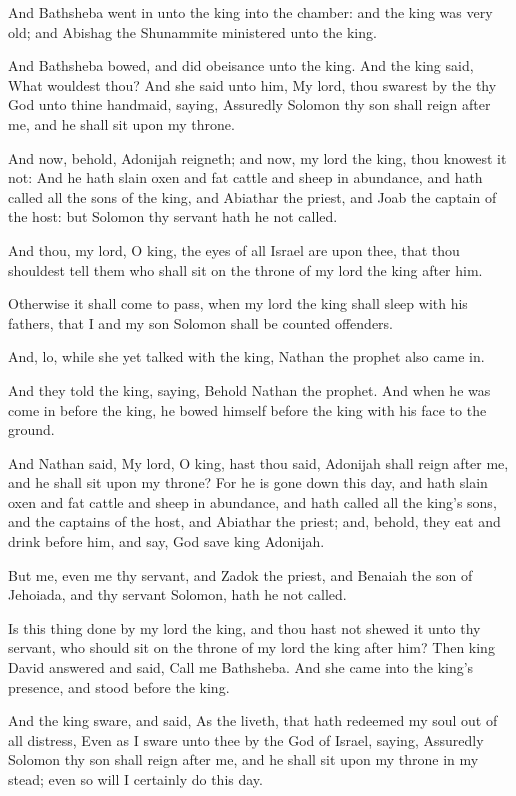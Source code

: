 \Verse And Bathsheba went in unto the king into the chamber: and the king was very old; and Abishag the Shunammite ministered unto the king.

\Verse And Bathsheba bowed, and did obeisance unto the king. And the king said, What wouldest thou?  \Verse And she said unto him, My lord, thou swarest by the \LORD thy God unto thine handmaid, saying, Assuredly Solomon thy son shall reign after me, and he shall sit upon my throne.

\Verse And now, behold, Adonijah reigneth; and now, my lord the king, thou knowest it not: \Verse And he hath slain oxen and fat cattle and sheep in abundance, and hath called all the sons of the king, and Abiathar the priest, and Joab the captain of the host: but Solomon thy servant hath he not called.

\Verse And thou, my lord, O king, the eyes of all Israel are upon thee, that thou shouldest tell them who shall sit on the throne of my lord the king after him.

\Verse Otherwise it shall come to pass, when my lord the king shall sleep with his fathers, that I and my son Solomon shall be counted offenders.

\Verse And, lo, while she yet talked with the king, Nathan the prophet also came in.

\Verse And they told the king, saying, Behold Nathan the prophet. And when he was come in before the king, he bowed himself before the king with his face to the ground.

\Verse And Nathan said, My lord, O king, hast thou said, Adonijah shall reign after me, and he shall sit upon my throne?  \Verse For he is gone down this day, and hath slain oxen and fat cattle and sheep in abundance, and hath called all the king's sons, and the captains of the host, and Abiathar the priest; and, behold, they eat and drink before him, and say, God save king Adonijah.

\Verse But me, even me thy servant, and Zadok the priest, and Benaiah the son of Jehoiada, and thy servant Solomon, hath he not called.

\Verse Is this thing done by my lord the king, and thou hast not shewed it unto thy servant, who should sit on the throne of my lord the king after him?  \Verse Then king David answered and said, Call me Bathsheba.  And she came into the king's presence, and stood before the king.

\Verse And the king sware, and said, As the \LORD liveth, that hath redeemed my soul out of all distress, \Verse Even as I sware unto thee by the \LORD God of Israel, saying, Assuredly Solomon thy son shall reign after me, and he shall sit upon my throne in my stead; even so will I certainly do this day.

